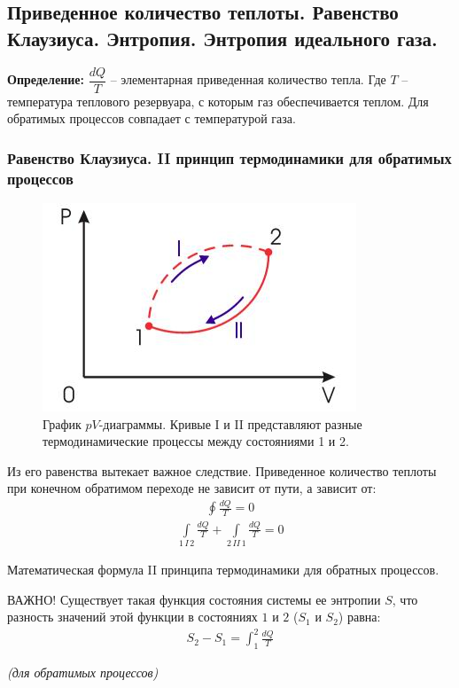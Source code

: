 \subsection{Приведенное количество теплоты. Равенство Клаузиуса. Энтропия. Энтропия идеального газа.}

\textbf{Определение: } $\dfrac{dQ}{T}$ -- элементарная приведенная количество тепла. Где $T$ -- температура теплового резервуара, с которым газ обеспечивается теплом. Для обратимых процессов совпадает с температурой газа.

\subsubsection*{Равенство Клаузиуса. II принцип термодинамики для обратимых процессов}
\begin{figure}[H]
	\centering
	\includegraphics[width=0.7\linewidth]{image/Rule}
	\caption{График $pV$-диаграммы.
		Кривые I и II представляют разные термодинамические процессы между состояниями 1 и 2.}
	\label{fig:9}
\end{figure}
Из его равенства вытекает важное следствие. Приведенное количество теплоты при конечном обратимом переходе не зависит от пути, а зависит от:
\begin{align} \label{34.1}
	\boxed{\oint \frac{dQ}{T} = 0}
\end{align}
\begin{align} \label{34.2}
	\int\limits_{1\,I\,2} \frac{dQ}{T} + \int\limits_{2\,II\,1} \frac{dQ}{T} = 0
\end{align}

Математическая формула II принципа термодинамики для обратных процессов.

\begin{tbox}{ВАЖНО!}
	Существует такая функция состояния системы ее энтропии $S$, что разность значений этой функции в состояниях $1$ и $2$ ($S_1$ и $S_2$) равна:
	\begin{align} \label{34.3}
		S_2 - S_1 = \int_{1}^{2}\frac{dQ}{T}
	\end{align}
	\begin{center}
		\textit{(для обратимых процессов)}
	\end{center}
\end{tbox}

